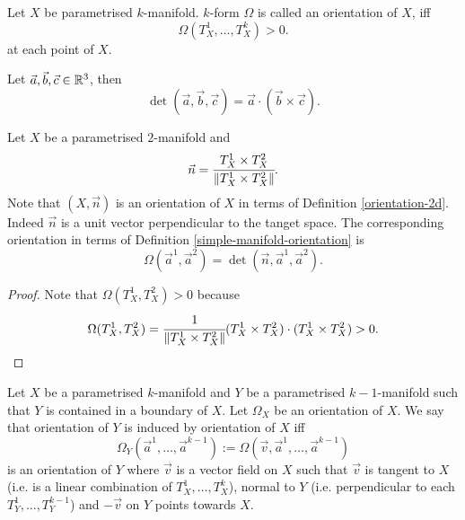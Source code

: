 \documentclass[main.tex]{subfiles}
\begin{document}
\begin{definition}
\label{simple-manifold-orientation}
Let $X$ be parametrised $k$-manifold. $k$-form $\Omega$ is called an orientation of $X$, iff
\begin{equation}
\Omega(T_X^1, \dots, T_X^k) > 0.
\end{equation}
at each point of $X$.
\end{definition}
\begin{proposition}
Let $\vec{a}, \vec{b}, \vec{c}\in \mathbb{R}^3$, then
\begin{equation}
\det(\vec{a}, \vec{b}, \vec{c}) = \vec{a}\cdot (\vec{b}\times \vec{c}).
\end{equation} 
\end{proposition}
\begin{example}
\label{surface-orientation}
Let $X$ be a parametrised $2$-manifold and
\begin{equation} 
\vec{n} = \cfrac{T^1_X\times T^2_X}{\norm{T^1_X\times T^2_X}}. 
\end{equation}
Note that $(X,\vec{n})$ is an orientation of $X$ in terms of Definition \ref{orientation-2d}. Indeed $\vec{n}$ is a unit vector perpendicular to the tanget space. The corresponding orientation in terms of Definition \ref{simple-manifold-orientation} is 
\begin{equation}
\Omega(\vec{a}^1, \vec{a}^2) = \det(\vec{n}, \vec{a}^1, \vec{a}^2).
\end{equation}
\end{example}
\begin{proof}
Note that $\Omega(T^1_X, T^2_X) > 0$ because
\begin{equation}
\Omega(T^1_X, T^2_X) = \cfrac{1}{\norm{T^1_X\times T^2_X}}(T^1_X\times T^2_X)\cdot (T^1_X\times T^2_X) > 0.
\end{equation}
\end{proof}
\begin{definition}
\label{simple-induced-orientation}
Let $X$ be a parametrised $k$-manifold and $Y$ be a parametrised $k-1$-manifold such that $Y$ is contained in a boundary of $X$. Let $\Omega_X$ be an orientation of $X$. We say that orientation of $Y$ is induced by orientation of $X$ iff
\begin{equation}
\Omega_Y(\vec{a}^1, \dots, \vec{a}^{k-1}) := \Omega(\vec{v}, \vec{a}^1, \dots, \vec{a}^{k-1}) 
\end{equation}
is an orientation of $Y$ where $\vec{v}$ is a vector field on $X$ such that $\vec{v}$ is tangent to $X$ (i.e. is a linear combination of $T_X^1, \dots, T_X^k$), normal to $Y$ (i.e. perpendicular to each $T_Y^1, \dots, T_Y^{k-1}$) and $-\vec{v}$ on $Y$ points towards $X$.
\end{definition}
\end{document}

